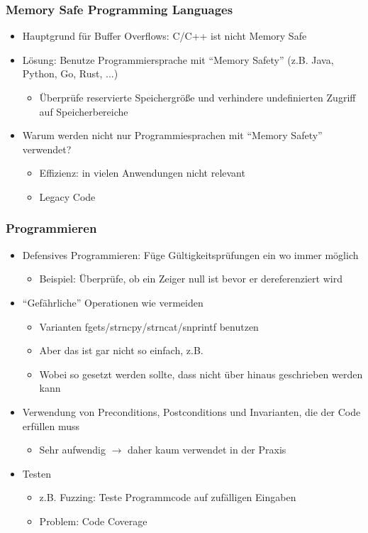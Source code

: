 \subsubsection*{Memory Safe Programming Languages}
\begin{itemize}
    \item Hauptgrund für Buffer Overflows: C/C++ ist nicht Memory Safe
    \item Lösung: Benutze Programmiersprache mit \enquote{Memory Safety} (z.B. Java, Python, Go, Rust, ...)
    \begin{itemize}
        \item Überprüfe reservierte Speichergröße und verhindere undefinierten Zugriff auf Speicherbereiche
    \end{itemize}
    \item Warum werden nicht nur Programmiesprachen mit \enquote{Memory Safety} verwendet?
    \begin{itemize}
        \item Effizienz: in vielen Anwendungen nicht relevant
        \item Legacy Code
    \end{itemize}
\end{itemize}
\subsubsection*{Programmieren}
\begin{itemize}
    \item Defensives Programmieren: Füge Gültigkeitsprüfungen ein wo immer möglich 
    \begin{itemize}
        \item Beispiel: Überprüfe, ob ein Zeiger null ist bevor er dereferenziert wird
    \end{itemize}
    \item \enquote{Gefährliche} Operationen wie  vermeiden
    \begin{itemize}
        \item Varianten fgets/strncpy/strncat/snprintf benutzen
        \item Aber das ist gar nicht so einfach, z.B. 
        \item Wobei  so gesetzt werden sollte, dass nicht über  hinaus geschrieben werden kann
    \end{itemize}
    \item Verwendung von Preconditions, Postconditions und Invarianten, die der Code erfüllen muss
    \begin{itemize}
        \item Sehr aufwendig $\rightarrow$ daher kaum verwendet in der Praxis
    \end{itemize}
    \item Testen
    \begin{itemize}
        \item z.B. Fuzzing: Teste Programmcode auf zufälligen Eingaben
        \item Problem: Code Coverage
    \end{itemize}
\end{itemize}
